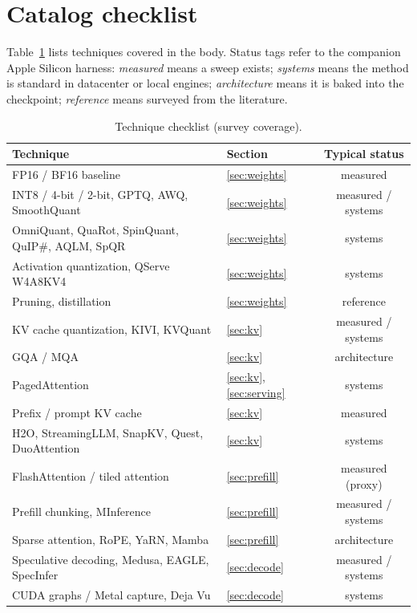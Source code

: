 \section{Catalog checklist}
\label{app:catalog}

Table~\ref{tab:checklist} lists techniques covered in the body. Status tags refer to the companion Apple Silicon harness: \emph{measured} means a sweep exists; \emph{systems} means the method is standard in datacenter or local engines; \emph{architecture} means it is baked into the checkpoint; \emph{reference} means surveyed from the literature.

\begin{table}[t]
  \centering
  \small
  \caption{Technique checklist (survey coverage).}
  \label{tab:checklist}
  \begin{tabular}{@{}llc@{}}
    \toprule
    Technique & Section & Typical status \\
    \midrule
    FP16 / BF16 baseline & \ref{sec:weights} & measured \\
    INT8 / 4-bit / 2-bit, GPTQ, AWQ, SmoothQuant & \ref{sec:weights} & measured / systems \\
    OmniQuant, QuaRot, SpinQuant, QuIP\#, AQLM, SpQR & \ref{sec:weights} & systems \\
    Activation quantization, QServe W4A8KV4 & \ref{sec:weights} & systems \\
    Pruning, distillation & \ref{sec:weights} & reference \\
    KV cache quantization, KIVI, KVQuant & \ref{sec:kv} & measured / systems \\
    GQA / MQA & \ref{sec:kv} & architecture \\
    PagedAttention & \ref{sec:kv}, \ref{sec:serving} & systems \\
    Prefix / prompt KV cache & \ref{sec:kv} & measured \\
    H2O, StreamingLLM, SnapKV, Quest, DuoAttention & \ref{sec:kv} & systems \\
    FlashAttention / tiled attention & \ref{sec:prefill} & measured (proxy) \\
    Prefill chunking, MInference & \ref{sec:prefill} & measured / systems \\
    Sparse attention, RoPE, YaRN, Mamba & \ref{sec:prefill} & architecture \\
    Speculative decoding, Medusa, EAGLE, SpecInfer & \ref{sec:decode} & measured / systems \\
    CUDA graphs / Metal capture, Deja Vu & \ref{sec:decode} & systems \\

\end{tabular}
\end{table}
